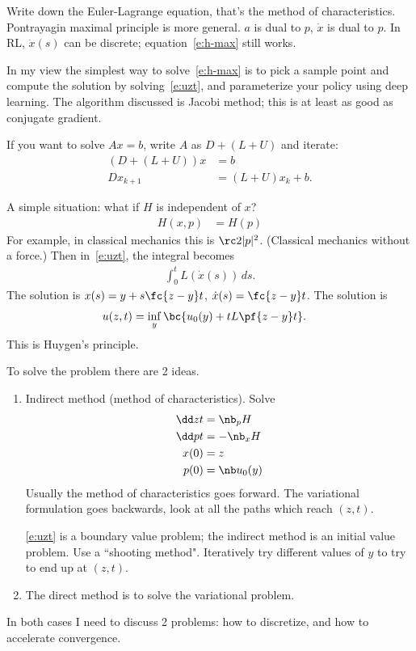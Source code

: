 Write down the Euler-Lagrange equation, that's the method of characteristics. Pontrayagin maximal principle is more general. 
$a$ is dual to $p$, $\dot x$ is dual to $p$.
In RL, $\dot x(s)$ can be discrete; equation~\eqref{e:h-max} still works. 

In my view the simplest way to solve~\eqref{e:h-max} is to pick a sample point and compute the solution by solving~\eqref{e:uzt}, and parameterize your policy using deep learning.
The algorithm discussed is Jacobi method; this is at least as good as conjugate gradient. 

If you want to solve $Ax=b$, write $A$ as $D+(L+U)$ and iterate: 
\begin{align}
(D+(L+U))x&=b\\
Dx_{k+1} &= (L+U) x_k + b.
\end{align}

A simple situation: what if $H$ is independent of $x$?
\begin{align}
H(x,p) &= H(p) 
\end{align}
For example, in classical mechanics this is $\rc 2 |p|^2$. (Classical mechanics without a force.) Then in~\eqref{e:uzt}, the integral becomes
\begin{align}
\int_0^t L(\dot x(s))\,ds.
\end{align}
The solution is $x(s) = y+s \fc{z-y}t$, $\dot x(s) = \fc{z-y}t$. The solution is 
\begin{align}
u(z,t) &= \inf_y \bc{u_0(y)+tL\pf{z-y}t}.
\end{align}
This is Huygen's principle.

To solve the problem there are 2 ideas.
\begin{enumerate}
\item
Indirect method (method of characteristics). Solve
\begin{align}
\dd zt &= \nb_pH\\
\dd pt &= -\nb_xH\\
x(0) &=z\\
p(0) &=\nb u_0(y)
\end{align}
Usually the method of characteristics goes forward. The variational formulation goes backwards, look at all the paths which reach $(z,t)$.

\eqref{e:uzt} is a boundary value problem; the indirect method is an initial value problem. 
Use a ``shooting method". Iteratively try different values of $y$ to try to end up at $(z,t)$. 
\item
The direct method is to solve the variational problem.
\end{enumerate}
In both cases I need to discuss 2 problems: how to discretize, and how to accelerate convergence.


